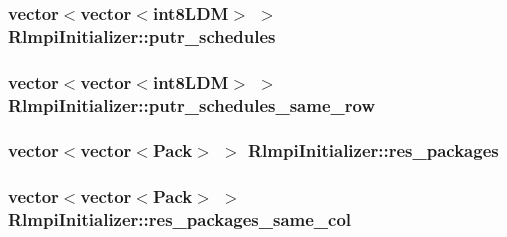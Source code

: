 \label{classRlmpiInitializer_a75b184687ae1ede0487c1091831159d8}
\hypertarget{classRlmpiInitializer_a649f1946c99b9d74f9aef3101e6e5c22}{
\subsubsection[{putr\_\-schedules}]{\setlength{\rightskip}{0pt plus 5cm}vector$<$vector$<${\bf int8LDM}$>$ $>$ {\bf RlmpiInitializer::putr\_\-schedules}}}
\label{classRlmpiInitializer_a649f1946c99b9d74f9aef3101e6e5c22}
\hypertarget{classRlmpiInitializer_a1a386df1505a50d37dbe36c9c9a50810}{
\subsubsection[{putr\_\-schedules\_\-same\_\-row}]{\setlength{\rightskip}{0pt plus 5cm}vector$<$vector$<${\bf int8LDM}$>$ $>$ {\bf RlmpiInitializer::putr\_\-schedules\_\-same\_\-row}}}
\label{classRlmpiInitializer_a1a386df1505a50d37dbe36c9c9a50810}
\hypertarget{classRlmpiInitializer_a95d99d1e97798553fd7232f747a4c838}{
\subsubsection[{res\_\-packages}]{\setlength{\rightskip}{0pt plus 5cm}vector$<$vector$<$Pack$>$ $>$ {\bf RlmpiInitializer::res\_\-packages}}}
\label{classRlmpiInitializer_a95d99d1e97798553fd7232f747a4c838}
\hypertarget{classRlmpiInitializer_a2b59d072cb46e37f839878474f72caab}{
\subsubsection[{res\_\-packages\_\-same\_\-col}]{\setlength{\rightskip}{0pt plus 5cm}vector$<$vector$<$Pack$>$ $>$ {\bf RlmpiInitializer::res\_\-packages\_\-same\_\-col}}}
\label{classRlmpiInitializer_a2b59d072cb46e37f839878474f72caab}
